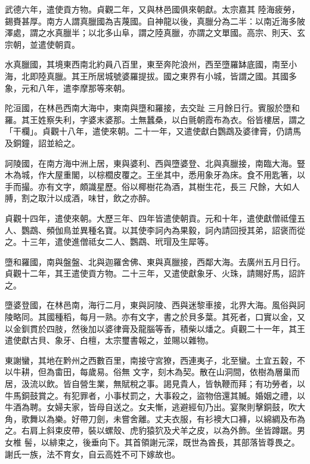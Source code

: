 \begin{pinyinscope}
 武德六年，遣使貢方物。貞觀二年，又與林邑國俱來朝獻。太宗嘉其
 陸海疲勞，錫賚甚厚。南方人謂真臘國為吉蔑國。自神龍以後，真臘分為二半：以南近海多陂澤處，謂之水真臘半；以北多山阜，謂之陸真臘，亦謂之文單國。高宗、則天、玄宗朝，並遣使朝貢。



 水真臘國，其境東西南北約員八百里，東至奔陀浪州，西至墮羅缽底國，南至小海，北即陸真臘。其王所居城號婆羅提拔。國之東界有小城，皆謂之國。其國多象，元和八年，遣李摩那等來朝。



 陀洹國，在林邑西南大海中，東南與墮和羅接，去交趾
 三月餘日行。賓服於墮和羅。其王姓察失利，字婆末婆那。土無蠶桑，以白氈朝霞布為衣。俗皆樓居，謂之「干欄」。貞觀十八年，遣使來朝。二十一年，又遣使獻白鸚鵡及婆律膏，仍請馬及銅鐘，詔並給之。



 訶陵國，在南方海中洲上居，東與婆利、西與墮婆登、北與真臘接，南臨大海。豎木為城，作大屋重閣，以棕櫚皮覆之。王坐其中，悉用象牙為床。食不用匙箸，以手而撮。亦有文字，頗識星歷。俗以椰樹花為酒，其樹生花，長三
 尺餘，大如人膊，割之取汁以成酒，味甘，飲之亦醉。



 貞觀十四年，遣使來朝。大歷三年、四年皆遣使朝貢。元和十年，遣使獻僧祗僮五人、鸚鵡、頻伽鳥並異種名寶。以其使李訶內為果毅，訶內請回授其弟，詔褒而從之。十三年，遣使進僧祗女二人、鸚鵡、玳瑁及生犀等。



 墮和羅國，南與盤盤、北與迦羅舍佛、東與真臘接，西鄰大海。去廣州五月日行。貞觀十二年，其王遣使貢方物。二十三年，又遣使獻象牙、火珠，請賜好馬，詔許之。



 墮婆登國，在林邑南，海行二月，東與訶陵、西與迷黎車接，北界大海。風俗與訶陵略同。其國種稻，每月一熟。亦有文字，書之於貝多葉。其死者，口實以金，又以金釧貫於四肢，然後加以婆律膏及龍腦等香，積柴以燔之。貞觀二十一年，其王遣使獻古貝、象牙、白檀，太宗璽書報之，並賜以雜物。



 東謝蠻，其地在黔州之西數百里，南接守宮獠，西連夷子，北至蠻。土宜五穀，不以牛耕，但為畬田，每歲易。俗無
 文字，刻木為契。散在山洞間，依樹為層巢而居，汲流以飲。皆自營生業，無賦稅之事。謁見貴人，皆執鞭而拜；有功勞者，以牛馬銅鼓賞之。有犯罪者，小事杖罰之，大事殺之，盜物倍還其贓。婚姻之禮，以牛酒為聘。女婦夫家，皆母自送之。女夫慚，逃避經旬乃出。宴聚則擊銅鼓，吹大角，歌舞以為樂。好帶刀劍，未嘗舍離。丈夫衣服，有衫襖大口褲，以綿綢及布為之。右肩上斜束皮帶，裝以螺殼、虎豹猿狖及犬羊之皮，以為外飾。坐皆蹲踞。男女椎
 髻，以緋束之，後垂向下。其首領謝元深，既世為酋長，其部落皆尊畏之。謝氏一族，法不育女，自云高姓不可下嫁故也。




\end{pinyinscope}
